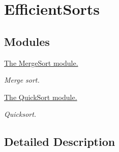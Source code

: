 \hypertarget{group__EfficientSorts}{}\section{Efficient\+Sorts}
\label{group__EfficientSorts}
\subsection*{Modules}
\begin{DoxyCompactItemize}
\item 
\hyperlink{group__MergeSort}{The Merge\+Sort module.}
\begin{DoxyCompactList}\small\item\em Merge sort. \end{DoxyCompactList}\item 
\hyperlink{group__QuickSort}{The Quick\+Sort module.}
\begin{DoxyCompactList}\small\item\em Quicksort. \end{DoxyCompactList}\end{DoxyCompactItemize}


\subsection{Detailed Description}
